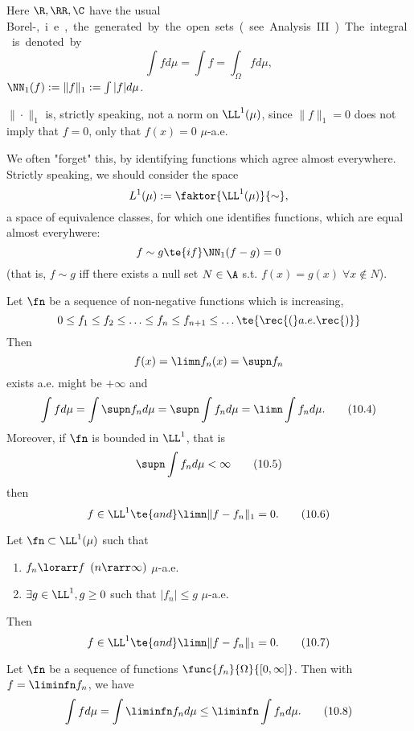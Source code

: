 \begin{enumerate}[label=\arabic*)]
	Here $\R,\RR,\C$ have the usual Borel-\si, i.e., the \si generated by the open sets (see Analysis III). 
	
	The integral is denoted by
	\[\int fd\mu=\int f=\int_\Omega fd\mu,\]
	$\NN_1(f):=\|f\|_1:=\int|f|d\mu$.\vspace{2mm}
	
	 $\|\cdot\|_1$ is, strictly speaking, not a norm on $\LL^1(\mu)$, since $\|f\|_1=0$ does not imply that $f=0$, only that $f(x)=0$ $\mu$-a.e.
	
	We often "forget" this, by identifying functions which agree almost everywhere. Strictly speaking, we should consider the space
	\[L^1(\mu):=\faktor{\LL^1(\mu)}{\sim},\]
	a space of equivalence classes, for which one identifies functions, which are equal almost everyhwere:
	\[f\sim g\te{ if }\NN_1(f-g)=0\]
	(that is, $f\sim g$ iff there exists a null set $N\in\A$ s.t. $f(x)=g(x)\;\forall x\notin N$).
\end{enumerate}

\begin{thm}\label{x.1}
	Let $\fn$ be a sequence of non-negative functions which is increasing,
	\[0\leq f_1\leq f_2\leq\ldots\leq f_n\leq f_{n+1}\leq\ldots \te{ \rec{(}a.e.\rec{)}}\]
	Then \[f(x)=\limn f_n(x)=\supn f_n\]
	exists a.e. \rec{(}might be $+\infty$\rec{)} and
	\[\int fd\mu=\int\supn f_nd\mu=\supn\int f_nd\mu=\limn\int f_nd\mu.\tag{10.4}\label{10.4}\]
	Moreover, if $\fn$ is bounded in $\LL^1$, that is
	\[\supn\int f_nd\mu<\infty\tag{10.5}\label{10.5}\]
	then
	\[f\in\LL^1\te{ and }\limn\|f-f_n\|_1=0.\tag{10.6}\label{10.6}\]
\end{thm}

\begin{thm}\label{x.2}
	Let $\fn\subset\LL^1(\mu)$ such that
	\begin{enumerate}[label=\alph*)]
		\item $f_n\lorarr f$ $(n\rarr\infty)$ $\mu$-a.e.
		\item $\exists g\in\LL^1,g\geq0$ such that $|f_n|\leq g$ $\mu$-a.e.
	\end{enumerate}
	Then 
	\[f\in\LL^1\te{ and }\limn\|f-f_n\|_1=0.\tag{10.7}\label{10.7}\]
\end{thm}

\begin{lem}[Fatou]\label{x.3}
	Let $\fn$ be a sequence of functions $\func{f_n}{\Omega}{[0,\infty]}$. Then with $f=\liminfn f_n$, we have
	\[\int fd\mu=\int\liminfn f_nd\mu\leq\liminfn\int f_nd\mu.\tag{10.8}\label{10.8}\]
\end{lem}

